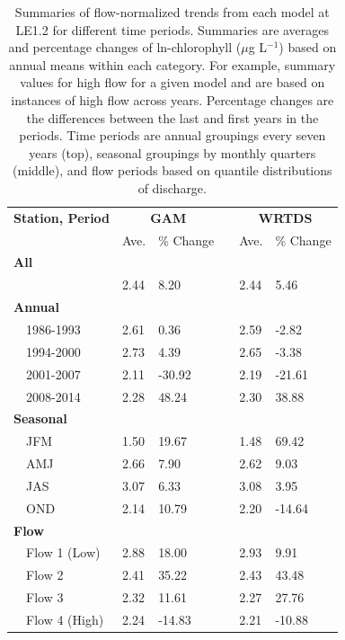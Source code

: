 \documentclass[letterpaper,12pt,oneside]{article}\usepackage[]{graphicx}\usepackage[]{color}
\newcommand{\mugl}{$\mu$g L$^{-1}$}
\begin{document}
\begin{table}[!tbp]
\caption{Summaries of flow-normalized trends from each model at LE1.2 for different time periods.  Summaries are averages and percentage changes of ln-chlorophyll (\mugl) based on annual means within each category.  For example, summary values for high flow for a given model and are based on instances of high flow across years.  Percentage changes are the differences between the last and first years in the periods.  Time periods are annual groupings every seven years (top), seasonal groupings by monthly quarters (middle), and flow periods based on quantile distributions of discharge.\label{tab:trendsTF16}} 
\begin{center}
\begin{tabular}{lllcll}
\hline\hline
\multicolumn{1}{l}{\bfseries Station, Period}&\multicolumn{2}{c}{\bfseries GAM}&\multicolumn{1}{c}{\bfseries }&\multicolumn{2}{c}{\bfseries WRTDS}\tabularnewline
\cline{2-3} \cline{5-6}
\multicolumn{1}{l}{}&\multicolumn{1}{c}{Ave.}&\multicolumn{1}{c}{\% Change}&\multicolumn{1}{c}{}&\multicolumn{1}{c}{Ave.}&\multicolumn{1}{c}{\% Change}\tabularnewline
\hline
{\bfseries All}&&&&&\tabularnewline
~~&2.44&  8.20&&2.44&  5.46\tabularnewline
\hline
{\bfseries Annual}&&&&&\tabularnewline
~~1986-1993&2.61&  0.36&&2.59& -2.82\tabularnewline
~~1994-2000&2.73&  4.39&&2.65& -3.38\tabularnewline
~~2001-2007&2.11&-30.92&&2.19&-21.61\tabularnewline
~~2008-2014&2.28& 48.24&&2.30& 38.88\tabularnewline
\hline
{\bfseries Seasonal}&&&&&\tabularnewline
~~JFM&1.50& 19.67&&1.48& 69.42\tabularnewline
~~AMJ&2.66&  7.90&&2.62&  9.03\tabularnewline
~~JAS&3.07&  6.33&&3.08&  3.95\tabularnewline
~~OND&2.14& 10.79&&2.20&-14.64\tabularnewline
\hline
{\bfseries Flow}&&&&&\tabularnewline
~~Flow 1 (Low)&2.88& 18.00&&2.93&  9.91\tabularnewline
~~Flow 2&2.41& 35.22&&2.43& 43.48\tabularnewline
~~Flow 3&2.32& 11.61&&2.27& 27.76\tabularnewline
~~Flow 4 (High)&2.24&-14.83&&2.21&-10.88\tabularnewline
\hline
\end{tabular}\end{center}

\end{table}
\end{document}
